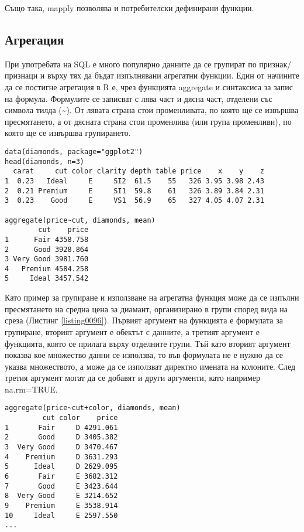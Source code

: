 Също така, mapply позволява и потребителски дефинирани функции.

\subsection{Агрегация}

При употребата на SQL е много популярно данните да се групират по признак/признаци и върху тях да бъдат изпълнявани агрегатни функции. Един от начините да се постигне агрегация в R е, чрез функцията aggregate и синтаксиса за запис на формула. Формулите се записват с лява част и дясна част, отделени със символа тилда (\textasciitilde). От лявата страна стои променливата, по която ще се извършва пресмятането, а от дясната страна стои променлива (или група променливи), по която ще се извършва групирането.

\begin{lstlisting}[caption=Групиране на данни, label=listing0096]
data(diamonds, package="ggplot2")
head(diamonds, n=3)
  carat     cut color clarity depth table price    x    y    z
1  0.23   Ideal     E     SI2  61.5    55   326 3.95 3.98 2.43
2  0.21 Premium     E     SI1  59.8    61   326 3.89 3.84 2.31
3  0.23    Good     E     VS1  56.9    65   327 4.05 4.07 2.31

aggregate(price~cut, diamonds, mean)
        cut    price
1      Fair 4358.758
2      Good 3928.864
3 Very Good 3981.760
4   Premium 4584.258
5     Ideal 3457.542
\end{lstlisting}

Като пример за групиране и използване на агрегатна функция може да се изпълни пресмятането на средна цена за диамант, организирано в групи според вида на среза (Листинг \ref{listing0096}). Първият аргумент на функцията е формулата за групиране, вторият аргумент е обектът с данните, а третият аргумент е функцията, която се прилага върху отделните групи. Тъй като вторият аргумент показва кое множество данни се използва, то във формулата не е нужно да се указва множеството, а може да се използват директно имената на колоните. След третия аргумент могат да се добавят и други аргументи, като например na.rm=TRUE.

\begin{lstlisting}[caption=Групиране по повече от една колона, label=listing0097]
aggregate(price~cut+color, diamonds, mean)
         cut color    price
1       Fair     D 4291.061
2       Good     D 3405.382
3  Very Good     D 3470.467
4    Premium     D 3631.293
5      Ideal     D 2629.095
6       Fair     E 3682.312
7       Good     E 3423.644
8  Very Good     E 3214.652
9    Premium     E 3538.914
10     Ideal     E 2597.550
...
\end{lstlisting}

